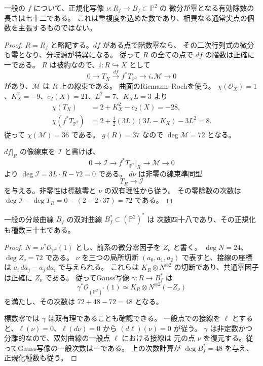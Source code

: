 \begin{corollary}[正規化写像の微分零因子]
\label{cor:septic-nonimmersion-divisor-v30}
一般の $f$ について、正規化写像 $\nu:R_f\to B_f\subset\mathbb P^2$ の
微分が零となる有効除数の長さは七十二である。
これは重複度を込めた数であり、相異なる通常尖点の個数を主張するものではない。
\end{corollary}

\begin{proof}
$R=R_f$ と略記する。$df$ がある点で階数零なら、
その二次行列式の微分も零となり、分岐源が特異になる。
従って $R$ の全ての点で $df$ の階数は正確に一である。
$R$ は被約なので、$i:R\hookrightarrow X$ として
\[
 0\longrightarrow T_X\xrightarrow{df}f^*T_{\mathbb P^2}
 \longrightarrow i_*\mathcal M\longrightarrow0
\]
があり、$\mathcal M$ は $R$ 上の線束である。
曲面のRiemann--Rochを使う。
$\chi(\mathcal O_X)=1$、$K_X^2=-9$、$c_2(X)=21$、$L^2=7$、$K_XL=3$ より
\begin{align*}
 \chi(T_X)&=2+K_X^2-c_2(X)=-28,\\
 \chi(f^*T_{\mathbb P^2})
   &=2+\frac12(3L)(3L-K_X)-3L^2=8.
\end{align*}
従って $\chi(\mathcal M)=36$ である。
$g(R)=37$ なので $\deg\mathcal M=72$ となる。

$df|_R$ の像線束を $\mathcal I$ と書けば、
\[
 0\longrightarrow\mathcal I\longrightarrow f^*T_{\mathbb P^2}|_R
       \longrightarrow\mathcal M\longrightarrow0
\]
より $\deg\mathcal I=3L\cdot R-72=0$ である。
$d\nu$ は非零の線束準同型
\[
 T_R\longrightarrow\mathcal I
\]
を与える。非零性は標数零と $\nu$ の双有理性から従う。
その零除数の次数は
$\deg\mathcal I-\deg T_R=0-(2-2\cdot37)=72$ である。
\end{proof}

\begin{corollary}[双対分岐曲線]
\label{cor:septic-dual-branch-v30}
一般の分岐曲線 $B_f$ の双対曲線 $B_f^*\subset(\mathbb P^2)^*$ は
次数四十八であり、その正規化も種数三十七である。
\end{corollary}

\begin{proof}
$N=\nu^*\mathcal O_{\mathbb P^2}(1)$ とし、前系の微分零因子を $Z_\nu$ と書く。
$\deg N=24$、$\deg Z_\nu=72$ である。
$\nu$ を三つの局所切断 $(a_0,a_1,a_2)$ で表すと、接線の座標は
$a_i\,da_j-a_j\,da_i$ で与えられる。
これらは $K_R\otimes N^{\otimes2}$ の切断であり、共通零因子は正確に $Z_\nu$ である。
従ってGauss写像 $\gamma:R\to B_f^*$ は
\[
 \gamma^*\mathcal O_{(\mathbb P^2)^*}(1)
   \simeq K_R\otimes N^{\otimes2}(-Z_\nu)
\]
を満たし、その次数は $72+48-72=48$ となる。

標数零では $\gamma$ は双有理であることも確認できる。
一般点での接線を $\ell$ とすると、$\ell(\nu)=0$、$\ell(d\nu)=0$ から
$(d\ell)(\nu)=0$ が従う。
$\gamma$ は非定数かつ分離的なので、双対曲線の一般点 $\ell$ における接線は
元の点 $\nu$ を復元する。従ってGauss写像の一般次数は一である。
上の次数計算が $\deg B_f^*=48$ を与え、正規化種数も従う。
\end{proof}

